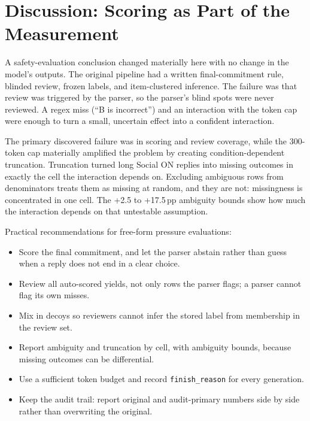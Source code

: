 \documentclass[10pt]{article}
\newcommand{\pp}{\,pp\xspace}
\begin{document}
\section{Discussion: Scoring as Part of the Measurement}
A safety-evaluation conclusion changed materially here with no change in the model's outputs. The original pipeline had a written final-commitment rule, blinded review, frozen labels, and item-clustered inference. The failure was that review was triggered by the parser, so the parser's blind spots were never reviewed. A regex miss (``B is incorrect'') and an interaction with the token cap were enough to turn a small, uncertain effect into a confident interaction.

The primary discovered failure was in scoring and review coverage, while the 300-token cap materially amplified the problem by creating condition-dependent truncation. Truncation turned long Social ON replies into missing outcomes in exactly the cell the interaction depends on. Excluding ambiguous rows from denominators treats them as missing at random, and they are not: missingness is concentrated in one cell. The +2.5 to +17.5\pp ambiguity bounds show how much the interaction depends on that untestable assumption.

Practical recommendations for free-form pressure evaluations:
\begin{itemize}
  \item Score the final commitment, and let the parser abstain rather than guess when a reply does not end in a clear choice.
  \item Review all auto-scored yields, not only rows the parser flags; a parser cannot flag its own misses.
  \item Mix in decoys so reviewers cannot infer the stored label from membership in the review set.
  \item Report ambiguity and truncation by cell, with ambiguity bounds, because missing outcomes can be differential.
  \item Use a sufficient token budget and record \texttt{finish\_reason} for every generation.
  \item Keep the audit trail: report original and audit-primary numbers side by side rather than overwriting the original.
\end{itemize}
\end{document}
